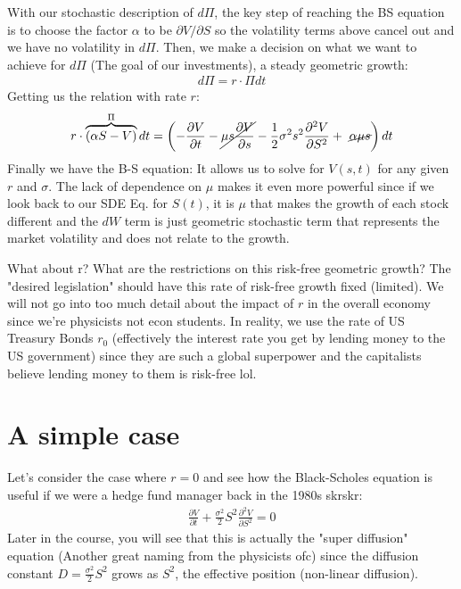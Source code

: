 \documentclass{report}
\begin{document}
With our stochastic description of $d\Pi$, the key step of reaching the BS equation is to choose the factor $\alpha$ to be $\partial V / \partial S$ so the volatility terms above cancel out and we have no volatility in $d\Pi$. Then, we make a decision on what we want to achieve for $d\Pi$ (The goal of our investments), a steady geometric growth:
\begin{align}
    d \Pi=r \cdot \Pi d t
\end{align}
Getting us the relation with rate $r$:
\begin{align}
    r \cdot \overbrace{(\alpha S-V)}^{\Pi} d t & =\left(-\frac{\partial V}{\partial t}-\cancel{\mu s \frac{\partial V}{\partial s}}-\frac{1}{2} \sigma^2 s^2 \frac{\partial^2 V}{\partial S^2}+\ \cancel{\alpha \mu s}\right) d t \\
\end{align}
Finally we have the B-S equation:
It allows us to solve for $V(s,t)$ for any given $r$ and $\sigma$. The lack of dependence on $\mu$ makes it even more powerful since if we look back to our SDE Eq. for $S(t)$, it is $\mu$ that makes the growth of each stock different and the $dW$ term is just geometric stochastic term that represents the market volatility and does not relate to the growth.

What about r? What are the restrictions on this risk-free geometric growth? The "desired legislation" should have this rate of risk-free growth fixed (limited). We will not go into too much detail about the impact of $r$ in the overall economy since we're physicists not econ students. In reality, we use the rate of US Treasury Bonds $r_0$ (effectively the interest rate you get by lending money to the US government) since they are such a global superpower and the capitalists believe lending money to them is risk-free lol.
\section{A simple case}
Let's consider the case where $r=0$ and see how the Black-Scholes equation is useful if we were a hedge fund manager back in the 1980s skrskr:
\begin{align}
    \frac{\partial V}{\partial t}+\frac{\sigma^2}{2} S^2 \frac{\partial^2 V}{\partial S^2}=0
\end{align}
Later in the course, you will see that this is actually the "super diffusion" equation (Another great naming from the physicists ofc) since the diffusion constant $D = \frac{\sigma^2}{2} S^2$ grows as $S^2$, the effective position (non-linear diffusion).
\end{document}
